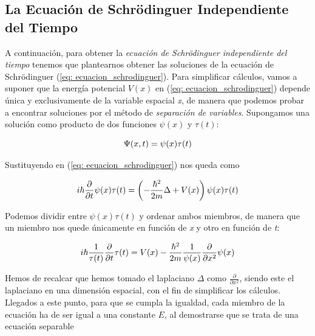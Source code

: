 \documentclass[12pt]{article}
\numberwithin{equation}{section} %
\begin{document}
    \subsection{La Ecuación de Schrödinguer Independiente del Tiempo}

    \vspace{5mm}

    A continuación, para obtener la \textit{ecuación de Schrödinguer independiente del tiempo} tenemos que plantearnos obtener las soluciones de la ecuación de Schrödinguer (\ref{eq: ecuacion_schrodinguer}). Para simplificar cálculos, vamos a suponer que la energía potencial \( V(x) \) en (\ref{eq: ecuacion_schrodinguer}) depende única y exclusivamente de la variable espacial \textit{x}, de manera que podemos probar a encontrar soluciones por el método de \textit{separación de variables}. Supongamos una solución como producto de dos funciones \( \psi(x) \) y \( \tau(t) \):

    \begin{equation*}
        \Psi(x, t) = \psi(x) \tau(t) \\[5pt]
    \end{equation*}

    Sustituyendo en (\ref{eq: ecuacion_schrodinguer}) nos queda como

    \begin{equation*}
        i \hbar \frac{\partial}{\partial t} \psi(x) \tau(t) = \left( - \frac{\hbar^{2}}{2m} \Delta + V(x) \right) \psi(x) \tau(t) \\[5pt]
    \end{equation*}

    Podemos dividir entre \( \psi(x) \tau(t) \) y ordenar ambos miembros, de manera que un miembro nos quede únicamente en función de \textit{x} y otro en función de \textit{t}:

    \begin{equation*}
        i \hbar \frac{1}{\tau(t)} \frac{\partial}{\partial t} \tau(t) = V(x) - \frac{\hbar^{2}}{2m} \frac{1}{\psi(x)} \frac{\partial}{\partial x^{2}} \psi(x) \\[5pt]
    \end{equation*}

    Hemos de recalcar que hemos tomado el laplaciano \( \Delta \) como \( \frac{\partial}{\partial x^{2}} \), siendo este el laplaciano en una dimensión espacial, con el fin de simplificar los cálculos. Llegados a este punto, para que se cumpla la igualdad, cada miembro de la ecuación ha de ser igual a una constante \( E \), al demostrarse que se trata de una ecuación separable
    
\end{document}
